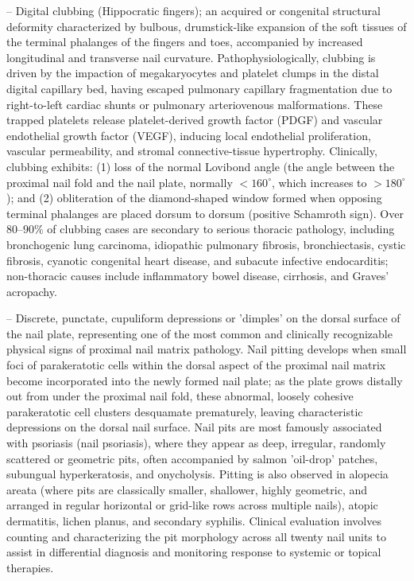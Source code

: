 -- Digital clubbing (Hippocratic fingers); an acquired or congenital structural deformity characterized by bulbous, drumstick-like expansion of the soft tissues of the terminal phalanges of the fingers and toes, accompanied by increased longitudinal and transverse nail curvature. Pathophysiologically, clubbing is driven by the impaction of megakaryocytes and platelet clumps in the distal digital capillary bed, having escaped pulmonary capillary fragmentation due to right-to-left cardiac shunts or pulmonary arteriovenous malformations. These trapped platelets release platelet-derived growth factor (PDGF) and vascular endothelial growth factor (VEGF), inducing local endothelial proliferation, vascular permeability, and stromal connective-tissue hypertrophy. Clinically, clubbing exhibits: (1) loss of the normal Lovibond angle (the angle between the proximal nail fold and the nail plate, normally $<160^\circ$, which increases to $>180^\circ$); and (2) obliteration of the diamond-shaped window formed when opposing terminal phalanges are placed dorsum to dorsum (positive Schamroth sign). Over $80\text{--}90\%$ of clubbing cases are secondary to serious thoracic pathology, including bronchogenic lung carcinoma, idiopathic pulmonary fibrosis, bronchiectasis, cystic fibrosis, cyanotic congenital heart disease, and subacute infective endocarditis; non-thoracic causes include inflammatory bowel disease, cirrhosis, and Graves' acropachy.

-- Discrete, punctate, cupuliform depressions or 'dimples' on the dorsal surface of the nail plate, representing one of the most common and clinically recognizable physical signs of proximal nail matrix pathology. Nail pitting develops when small foci of parakeratotic cells within the dorsal aspect of the proximal nail matrix become incorporated into the newly formed nail plate; as the plate grows distally out from under the proximal nail fold, these abnormal, loosely cohesive parakeratotic cell clusters desquamate prematurely, leaving characteristic depressions on the dorsal nail surface. Nail pits are most famously associated with psoriasis (nail psoriasis), where they appear as deep, irregular, randomly scattered or geometric pits, often accompanied by salmon 'oil-drop' patches, subungual hyperkeratosis, and onycholysis. Pitting is also observed in alopecia areata (where pits are classically smaller, shallower, highly geometric, and arranged in regular horizontal or grid-like rows across multiple nails), atopic dermatitis, lichen planus, and secondary syphilis. Clinical evaluation involves counting and characterizing the pit morphology across all twenty nail units to assist in differential diagnosis and monitoring response to systemic or topical therapies.

